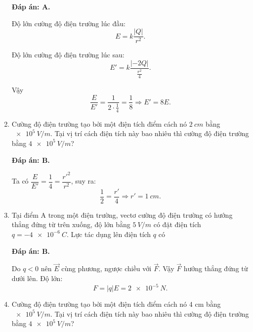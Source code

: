 \begin{enumerate}[label=\bfseries Câu \arabic*:]
{	}
	\loigiai
	{	\textbf{Đáp án: A.}
		
		Độ lớn cường độ điện trường lúc đầu:
		$$E=k \dfrac{|Q|}{r^2}.$$
		
		Độ lớn cường độ điện trường lúc sau:
		$$E'=k \dfrac{|-2Q|}{\frac{r^2}{4}}.$$
		
		Vậy
		$$\dfrac{E}{E'} = \dfrac{1}{2\cdot\frac{1}{4}} = \dfrac{1}{8} \Rightarrow E'=8E.$$
	}
	\item {}
	
	\cauhoi
	{Cường độ điện trường tạo bởi một điện tích điểm cách nó $\SI{2}{cm}$ bằng $\SI{e5}{V/m}$. Tại vị trí cách điện tích này bao nhiêu thì cường độ điện trường bằng $\SI{4e5}{V/m}$?
		
	}
	\loigiai
	{	\textbf{Đáp án: B.}
		
		Ta có $\dfrac{E}{E'} = \dfrac{1}{4} = \dfrac{r'^2}{r^2}$, suy ra:
		$$\dfrac{1}{2} = \dfrac{r'}{4} \Rightarrow r'=\SI{1}{cm}.$$
	}
	\item {}
	
	\cauhoi
	{Tại điểm A trong một điện trường, vectơ cường độ điện trường có hướng thẳng đứng từ trên xuống, độ lớn bằng $\SI{5}{V/m}$ có đặt điện tích $q=\SI{-4e-6}{C}$. Lực tác dụng lên điện tích $q$ có
		
	}
	\loigiai
	{	\textbf{Đáp án: B.}
		
		Do $q<0$ nên $\vec E$ cùng phương, ngược chiều với $\vec F$. Vậy $\vec F$ hướng thẳng đứng từ dưới lên. Độ lớn:
		$$F=|q|E = \SI{2e-5}{N}.$$
	}
	\item {}
	
	\cauhoi
	{Cường độ điện trường tạo bởi một điện tích điểm cách nó 4 cm bằng $\SI{e5}{V/m}$. Tại vị trí cách điện tích này bao nhiêu thì cường độ điện trường bằng $\SI{4e5}{V/m}$?
		
}
\end{enumerate}
